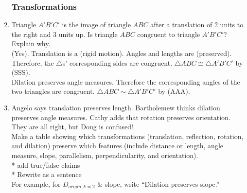 \documentclass[12pt, twoside]{article}
\begin{document}
\begin{enumerate}
  

  \subsubsection*{Transformations}
  \item Triangle $A'B'C'$ is the image of triangle $ABC$ after a translation of 2 units to the right and 3 units up. Is triangle $ABC$ congruent to triangle $A'B'C'$? Explain why.\\
  (Yes). Translation is a (rigid motion). Angles and lengths are (preserved). Therefore, the $\triangle$s’ corresponding sides are congruent. $\triangle ABC \cong \triangle A'B'C'$ by (SSS).\\

  Dilation preserves angle measures. Therefore the corresponding angles of the two triangles are congruent. $\triangle ABC \sim \triangle A'B'C'$  by (AAA).

  \item Angelo says translation preserves length. Bartholemew thinks dilation preserves angle measures. Cathy adds that rotation preserves orientation. They are all right, but Doug is confused! \\[0.5cm]
  Make a table showing which transformations (translation, reflection, rotation, and dilation) preserve which features (include distance or length, angle measure, slope, parallelism, perpendicularity, and orientation).\\
  * add true/false claims\\
  * Rewrite as a sentence\\
   For example, for $D_{origin, k=2}$ \& slope, write “Dilation preserves slope.”
   
  \end{enumerate}
\end{document}
